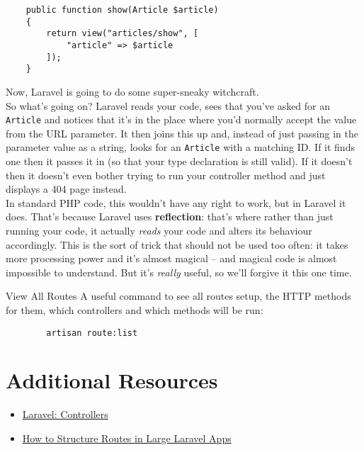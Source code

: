 \begin{verbatim}
    public function show(Article $article)
    {
        return view("articles/show", [
            "article" => $article
        ]);
    }
\end{verbatim}

Now, Laravel is going to do some super-sneaky witchcraft.
\\

So what's going on? Laravel reads your code, sees that you've asked for an \texttt{Article} and notices that it's in the place where you'd normally accept the value from the URL parameter. It then joins this up and, instead of just passing in the parameter value as a string, looks for an \texttt{Article} with a matching ID. If it finds one then it passes it in (so that your type declaration is still valid). If it doesn't then it doesn't even bother trying to run your controller method and just displays a 404 page instead.
\\

In standard PHP code, this wouldn't have any right to work, but in Laravel it does. That's because Laravel uses \textbf{reflection}: that's where rather than just running your code, it actually \textit{reads} your code and alters its behaviour accordingly. This is the sort of trick that should not be used too often: it takes more processing power and it's almost magical – and magical code is almost impossible to understand. But it's \textit{really} useful, so we'll forgive it this one time.


\begin{infobox}{View All Routes}
    A useful command to see all routes setup, the HTTP methods for them, which controllers and which methods will be run:

    \begin{verbatim}
        artisan route:list
    \end{verbatim}

\end{infobox}

\section{Additional Resources}

\begin{itemize}[leftmargin=*]
    \item \href{http://laravel.com/docs/master/controllers}{Laravel: Controllers}
    \item \href{https://laraveldaily.com/how-to-structure-routes-in-large-laravel-projects/}{How to Structure Routes in Large Laravel Apps}
\end{itemize}
